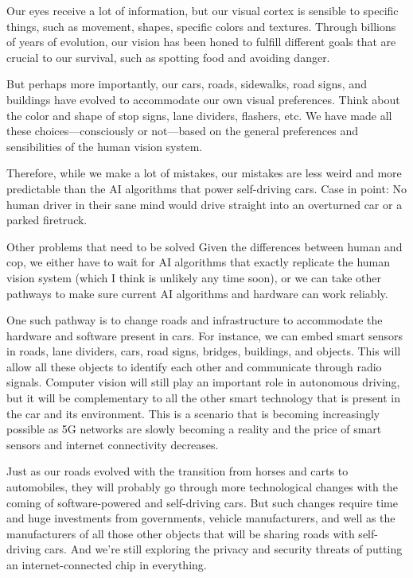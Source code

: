 Our eyes receive a lot of information, but our visual cortex is sensible to specific things, such as movement, shapes, specific colors and textures. Through billions of years of evolution, our vision has been honed to fulfill different goals that are crucial to our survival, such as spotting food and avoiding danger.

But perhaps more importantly, our cars, roads, sidewalks, road signs, and buildings have evolved to accommodate our own visual preferences. Think about the color and shape of stop signs, lane dividers, flashers, etc. We have made all these choices—consciously or not—based on the general preferences and sensibilities of the human vision system.

Therefore, while we make a lot of mistakes, our mistakes are less weird and more predictable than the AI algorithms that power self-driving cars. Case in point: No human driver in their sane mind would drive straight into an overturned car or a parked firetruck.

Other problems that need to be solved
Given the differences between human and cop, we either have to wait for AI algorithms that exactly replicate the human vision system (which I think is unlikely any time soon), or we can take other pathways to make sure current AI algorithms and hardware can work reliably.

One such pathway is to change roads and infrastructure to accommodate the hardware and software present in cars. For instance, we can embed smart sensors in roads, lane dividers, cars, road signs, bridges, buildings, and objects. This will allow all these objects to identify each other and communicate through radio signals. Computer vision will still play an important role in autonomous driving, but it will be complementary to all the other smart technology that is present in the car and its environment. This is a scenario that is becoming increasingly possible as 5G networks are slowly becoming a reality and the price of smart sensors and internet connectivity decreases.

Just as our roads evolved with the transition from horses and carts to automobiles, they will probably go through more technological changes with the coming of software-powered and self-driving cars. But such changes require time and huge investments from governments, vehicle manufacturers, and well as the manufacturers of all those other objects that will be sharing roads with self-driving cars. And we’re still exploring the privacy and security threats of putting an internet-connected chip in everything.

